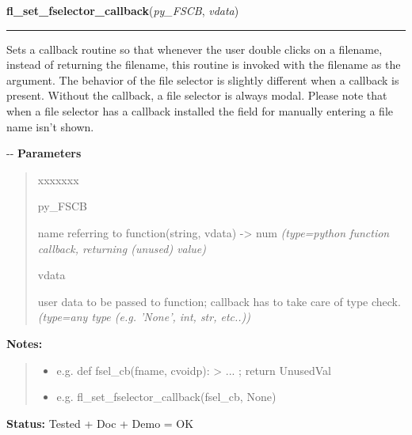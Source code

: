 \hspace{.8\funcindent}\begin{boxedminipage}{\funcwidth}

    \raggedright \textbf{fl\_set\_fselector\_callback}(\textit{py\_FSCB}, \textit{vdata})

    \vspace{-1.5ex}

    \rule{\textwidth}{0.5\fboxrule}
\setlength{\parskip}{2ex}

Sets a callback routine so that whenever the user double clicks on a
filename, instead of returning the filename, this routine is invoked with
the filename as the argument. The behavior of the file selector is
slightly different when a callback is present. Without the callback, a
file selector is always modal. Please note that when a file selector has
a callback installed the field for manually entering a file name isn't
shown.

-{}-
\setlength{\parskip}{1ex}
      \textbf{Parameters}
      \vspace{-1ex}

      \begin{quote}
        \begin{Ventry}{xxxxxxx}

          \item[py\_FSCB]


name referring to function(string, vdata) -> num
            {\it (type=python function callback, returning (unused) value)}

          \item[vdata]


user data to be passed to function; callback has to take care of
type check.
            {\it (type=any type (e.g. 'None', int, str, etc..))}

        \end{Ventry}

      \end{quote}

\textbf{Notes:}
\begin{quote}
  \begin{itemize}

  \item
    \setlength{\parskip}{0.6ex}

e.g. def fsel\_cb(fname, cvoidp): > ... ; return UnusedVal


  \item 
e.g. fl\_set\_fselector\_callback(fsel\_cb, None)


\end{itemize}

\end{quote}

\textbf{Status:} 
Tested + Doc + Demo = OK


    \end{boxedminipage}

